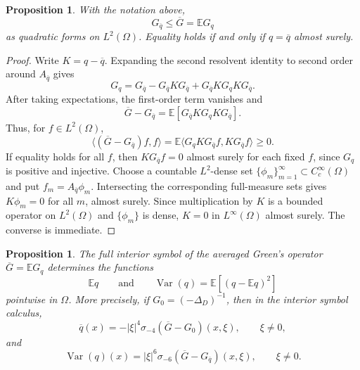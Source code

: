 \documentclass[11pt]{article}
\newcommand{\OmegaD}{\Omega}
\newcommand{\E}{\mathbb E}
\newcommand{\Var}{\operatorname{Var}}
\newcommand{\la}{\langle}
\newcommand{\ra}{\rangle}
\theoremstyle{plain}
\newtheorem{proposition}[theorem]{Proposition}
\theoremstyle{definition}
\theoremstyle{remark}
\begin{document}
\begin{proposition}\label{prop:Green-Jensen}
With the notation above,
\begin{equation}\label{eq:Green-Jensen}
  G_{\overline q}\le \overline G=\E G_q
\end{equation}
as quadratic forms on $L^2(\OmegaD)$.  Equality holds if and only if $q=\overline q$ almost surely.
\end{proposition}

\begin{proof}
Write $K=q-\overline q$.  Expanding the second resolvent identity to second order around $A_{\overline q}$ gives
\begin{equation}\label{eq:second-order-resolvent}
  G_q=G_{\overline q}-G_{\overline q}KG_{\overline q}
       +G_{\overline q}KG_qKG_{\overline q}.
\end{equation}
After taking expectations, the first-order term vanishes and
\[
  \overline G-G_{\overline q}
  =\E\left[G_{\overline q}KG_qKG_{\overline q}\right].
\]
Thus, for $f\in L^2(\OmegaD)$,
\[
  \la(\overline G-G_{\overline q})f,f\ra
  =\E\la G_qKG_{\overline q}f,KG_{\overline q}f\ra\ge0.
\]
If equality holds for all $f$, then $KG_{\overline q}f=0$ almost surely for each fixed $f$, since $G_q$ is positive and injective.  Choose a countable $L^2$-dense set $\{\phi_m\}_{m=1}^\infty\subset C_c^\infty(\OmegaD)$ and put $f_m=A_{\overline q}\phi_m$.  Intersecting the corresponding full-measure sets gives $K\phi_m=0$ for all $m$, almost surely.  Since multiplication by $K$ is a bounded operator on $L^2(\OmegaD)$ and $\{\phi_m\}$ is dense, $K=0$ in $L^\infty(\OmegaD)$ almost surely.  The converse is immediate.
\end{proof}

\begin{proposition}\label{prop:Green-mean-variance}
The full interior symbol of the averaged Green's operator $\overline G=\E G_q$ determines  the  functions
\[
  \E q
  \qquad\text{and}\qquad
  \Var(q)=\E[(q-\E q)^2]
\]
pointwise in $\OmegaD$.  More precisely, if $G_0=(-\Delta_D)^{-1}$, then in the interior symbol calculus,
\begin{equation}\label{eq:recover-mean-symbol}
  \overline q(x)=-|\xi|^4\sigma_{-4}(\overline G-G_0)(x,\xi),
  \qquad \xi\ne0,
\end{equation}
and
\begin{equation}\label{eq:recover-var-symbol}
  \Var(q)(x)=|\xi|^6\sigma_{-6}(\overline G-G_{\overline q})(x,\xi),
  \qquad \xi\ne0.
\end{equation}
\end{proposition}
\end{document}
